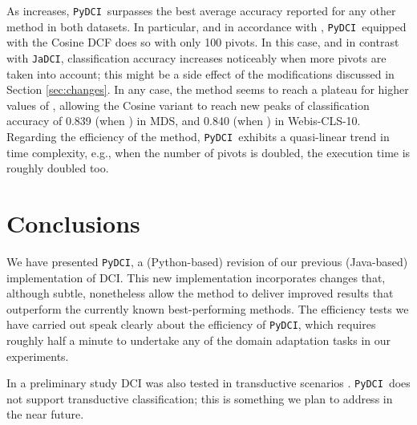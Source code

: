 \documentclass{article}
\newcommand{\jadci}{\texttt{JaDCI}}
\newcommand{\pydci}{\texttt{PyDCI}}
\begin{document}
As  increases, \pydci\ surpasses the best average accuracy
reported for any other method in both datasets. In particular, and in
accordance with \citep{Moreo:2016fg}, \pydci\ equipped with the Cosine
DCF does so with only 100 pivots.  In this case, and in contrast with
\jadci, classification accuracy increases noticeably when more pivots
are taken into account; this might be a side effect of the
modifications discussed in Section \ref{sec:changes}.  In any case,
the method seems to reach a plateau for higher values of ,
allowing the Cosine variant to reach new peaks of classification
accuracy of 0.839 (when ) in MDS, and 0.840 (when
) in Webis-CLS-10.  Regarding the efficiency of the
method, \pydci\ exhibits a quasi-linear trend in time complexity,
e.g., when the number of pivots is doubled, the execution time is
roughly doubled too.



\section{Conclusions}
\label{sec:conclusion}

\noindent We have presented \pydci, a (Python-based) revision of our
previous (Java-based) implementation of DCI.  This new implementation
incorporates changes that, although subtle, nonetheless allow the
method to deliver improved results that outperform the currently known
best-performing methods.  The efficiency tests we have carried out
speak clearly about the efficiency of \pydci, which requires roughly
half a minute to undertake any of the domain adaptation tasks in our
experiments.

In a preliminary study DCI was also tested in transductive scenarios
\citep{Moreo:2016pa}.  \pydci\ does not support transductive
classification; this is something we plan to address in the near
future.





\end{document}
